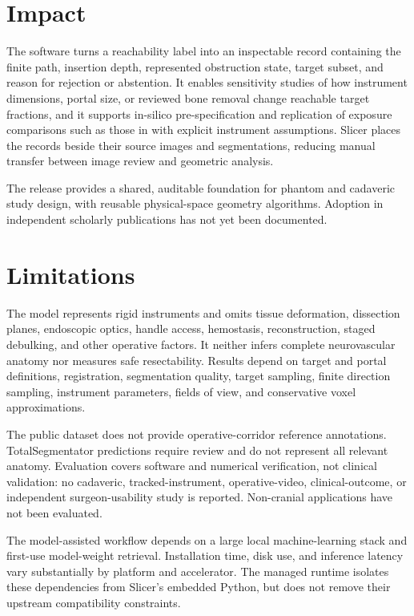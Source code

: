 \documentclass[preprint,12pt]{elsarticle}
\begin{document}
\section{Impact}

The software turns a reachability label into an inspectable record containing the finite path, insertion depth, represented obstruction state, target subset, and reason for rejection or abstention. It enables sensitivity studies of how instrument dimensions, portal size, or reviewed bone removal change reachable target fractions, and it supports in-silico pre-specification and replication of exposure comparisons such as those in \citep{roth2009,wilson2014,elhadi2014,lin2021,agosti2022} with explicit instrument assumptions. Slicer places the records beside their source images and segmentations, reducing manual transfer between image review and geometric analysis.

The release provides a shared, auditable foundation for phantom and cadaveric study design, with reusable physical-space geometry algorithms. Adoption in independent scholarly publications has not yet been documented.

\section{Limitations}

The model represents rigid instruments and omits tissue deformation, dissection planes, endoscopic optics, handle access, hemostasis, reconstruction, staged debulking, and other operative factors. It neither infers complete neurovascular anatomy nor measures safe resectability. Results depend on target and portal definitions, registration, segmentation quality, target sampling, finite direction sampling, instrument parameters, fields of view, and conservative voxel approximations.

The public dataset does not provide operative-corridor reference annotations. TotalSegmentator predictions require review and do not represent all relevant anatomy. Evaluation covers software and numerical verification, not clinical validation: no cadaveric, tracked-instrument, operative-video, clinical-outcome, or independent surgeon-usability study is reported. Non-cranial applications have not been evaluated.

The model-assisted workflow depends on a large local machine-learning stack and first-use model-weight retrieval. Installation time, disk use, and inference latency vary substantially by platform and accelerator. The managed runtime isolates these dependencies from Slicer's embedded Python, but does not remove their upstream compatibility constraints.
\end{document}
